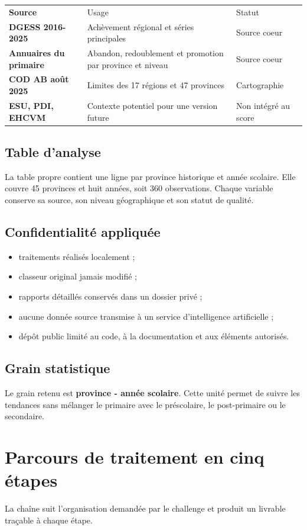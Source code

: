 \documentclass[12pt,a4paper]{article}
\begin{document}
\begin{tabularx}{\textwidth}{>{\bfseries}p{3.5cm} X p{3.1cm}}
\rowcolor{Navy}\color{white}Source & \color{white}Usage & \color{white}Statut\\
DGESS 2016-2025 & Achèvement régional et séries principales & Source coeur\\
Annuaires du primaire & Abandon, redoublement et promotion par province et niveau & Source coeur\\
COD AB août 2025 & Limites des 17 régions et 47 provinces & Cartographie\\
ESU, PDI, EHCVM & Contexte potentiel pour une version future & Non intégré au score\\
\end{tabularx}

\subsection{Table d'analyse}
La table propre contient une ligne par province historique et année scolaire. Elle couvre 45 provinces et huit années, soit 360 observations. Chaque variable conserve sa source, son niveau géographique et son statut de qualité.

\subsection{Confidentialité appliquée}
\begin{itemize}
  \item traitements réalisés localement ;
  \item classeur original jamais modifié ;
  \item rapports détaillés conservés dans un dossier privé ;
  \item aucune donnée source transmise à un service d'intelligence artificielle ;
  \item dépôt public limité au code, à la documentation et aux éléments autorisés.
\end{itemize}

\subsection{Grain statistique}
Le grain retenu est \textbf{province - année scolaire}. Cette unité permet de suivre les tendances sans mélanger le primaire avec le préscolaire, le post-primaire ou le secondaire.
\clearpage
\thispagestyle{fancy}

\section{Parcours de traitement en cinq étapes}
La chaîne suit l'organisation demandée par le challenge et produit un livrable traçable à chaque étape.
\end{document}

